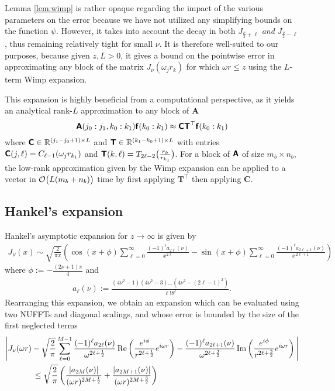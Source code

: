 Lemma \ref{lem:wimp} is rather opaque regarding the impact of the various
parameters on the error because we have not utilized any simplifying bounds on
the function $\psi$. However, it takes into account the decay in both
$J_{\frac{\nu}{2}+\ell}$ \textit{and} $J_{\frac{\nu}{2}-\ell}$, thus remaining
relatively tight for small $\nu$. It is therefore well-suited to our purposes,
because given $z, L > 0$, it gives a bound on the pointwise error in
approximating any block of the matrix $J_\nu(\omega_j r_k)$ for which $\omega r
\leq z$ using the $L$-term Wimp expansion. 

This expansion is highly beneficial from a computational perspective, as it
yields an analytical rank-$L$ approximation to any block of $\bm{A}$
\begin{equation}
    \bm{\mathsf{A}}(j_0:j_1, k_0:k_1) \bm{\mathsf{f}}(k_0:k_1)
    \approx \bm{\mathsf{C}}\bm{\mathsf{T}}^\top \bm{\mathsf{f}}(k_0:k_1)
\end{equation}
where $\bm{\mathsf{C}} \in \mathbb{R}^{(j_1-j_0+1) \times L}$ and $\bm{\mathsf{T}} \in \mathbb{R}^{(k_1-k_0+1)
\times L}$ with entries $\bm{\mathsf{C}}(j,\ell) = C_{\ell-1}(\omega_j r_{k_1})$ and
$\bm{\mathsf{T}}(k,\ell) = T_{2\ell-2}\big(\frac{r_k}{r_{k_1}}\big)$. For a block of
$\bm{\mathsf{A}}$ of size $m_b \times n_b$, the low-rank approximation given by the Wimp
expansion can be applied to a vector in $\mathcal{O}\big(L(m_b + n_b)\big)$ time by
first applying $\bm{T}^\top$ then applying $\bm{C}$.

\subsection{Hankel's expansion}
\label{sec:asymptotic}

Hankel's asymptotic expansion for $z \to \infty$ is given by
\begin{align} \label{eq:asymptotic-expansion}
    J_\nu(x)
    \sim \sqrt{\frac{2}{\pi x}} \left( 
        \cos\left(x + \phi\right) \sum_{\ell=0}^{\infty} \frac{(-1)^\ell a_{2\ell}(\nu)}{x^{2\ell}}
        - \sin\left(x + \phi\right) \sum_{\ell=0}^{\infty} \frac{(-1)^\ell a_{2\ell+1}(\nu)}{x^{2\ell+1}}
        \right)
\end{align}
where $\phi := - \frac{(2\nu+1)\pi}{4}$ and 
\begin{align}
    a_\ell(\nu) := \frac{(4\nu^2 - 1)(4\nu^2 - 3)\dots(4\nu^2 - (2\ell-1)^2)}{\ell! 8^\ell}.
\end{align}
Rearranging this expansion, we obtain an expansion which can be evaluated using
two NUFFTs and diagonal scalings, and whose error is bounded by the size of the
first neglected terms
\begin{align}
    & \Bigg| J_\nu(\omega r)
    - \sqrt{\frac{2}{\pi}} \sum_{\ell=0}^{M-1} 
        \frac{(-1)^\ell a_{2\ell}(\nu)}{\omega^{2\ell + \frac{1}{2}}} \Re\left( \frac{e^{i\phi}}{r^{2\ell+\frac{1}{2}}} e^{i\omega r}\right)
        - \frac{(-1)^\ell a_{2\ell+1}(\nu)}{\omega^{2\ell+\frac{3}{2}}} \Im\left(\frac{e^{i\phi}}{r^{2\ell+\frac{3}{2}}} e^{i\omega r} \right)
        \Bigg| \\
        &\hspace*{0.1\textwidth} \leq \sqrt{\frac{2}{\pi}} \left( \frac{\abs{a_{2M}(\nu)}}{(\omega r)^{2M+\frac{1}{2}}} + \frac{\abs{a_{2M+1}(\nu)}}{(\omega r)^{2M+\frac{3}{2}}} \right)
\end{align}


